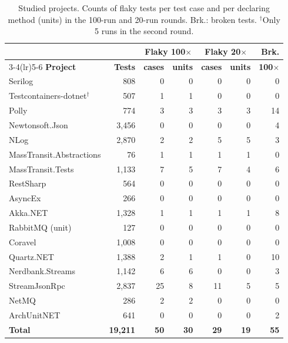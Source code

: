 \begin{table}[!h]
\caption{Studied projects. Counts of flaky tests per test case and per declaring method (units) in the 100-run and 20-run rounds. Brk.: broken tests. $^{\dagger}$Only 5 runs in the second round.}
\label{tab:projetos}
\centering
\scriptsize
\setlength{\tabcolsep}{2.7pt}
\begin{tabular}{@{}lrrrrrr@{}}
\toprule
 & & \multicolumn{2}{c}{\textbf{Flaky 100$\times$}} & \multicolumn{2}{c}{\textbf{Flaky 20$\times$}} & \textbf{Brk.} \\
\cmidrule(lr){3-4}\cmidrule(lr){5-6}
\textbf{Project} & \textbf{Tests} & \textbf{cases} & \textbf{units} & \textbf{cases} & \textbf{units} & \textbf{100$\times$} \\
\midrule
Serilog                  &    808 &  0 & 0 &  0 & 0 &  0 \\
Testcontainers-dotnet$^{\dagger}$ &    507 &  1 & 1 &  0 & 0 &  0 \\
Polly                    &    774 &  3 & 3 &  3 & 3 & 14 \\
Newtonsoft.Json          &  3,456 &  0 & 0 &  0 & 0 &  4 \\
NLog                     &  2,870 &  2 & 2 &  5 & 5 &  3 \\
MassTransit.Abstractions &     76 &  1 & 1 &  1 & 1 &  0 \\
MassTransit.Tests        &  1,133 &  7 & 5 &  7 & 4 &  6 \\
RestSharp                &    564 &  0 & 0 &  0 & 0 &  0 \\
AsyncEx                  &    266 &  0 & 0 &  0 & 0 &  0 \\
Akka.NET                 &  1,328 &  1 & 1 &  1 & 1 &  8 \\
RabbitMQ (unit)          &    127 &  0 & 0 &  0 & 0 &  0 \\
Coravel                  &  1,008 &  0 & 0 &  0 & 0 &  0 \\
Quartz.NET               &  1,388 &  2 & 1 &  1 & 0 & 10 \\
Nerdbank.Streams         &  1,142 &  6 & 6 &  0 & 0 &  3 \\
StreamJsonRpc            &  2,837 & 25 & 8 & 11 & 5 &  5 \\
NetMQ                    &    286 &  2 & 2 &  0 & 0 &  0 \\
ArchUnitNET              &    641 &  0 & 0 &  0 & 0 &  2 \\
\midrule
\textbf{Total}           & \textbf{19,211} & \textbf{50} & \textbf{30} & \textbf{29} & \textbf{19} & \textbf{55} \\
\bottomrule
\end{tabular}
\end{table}


